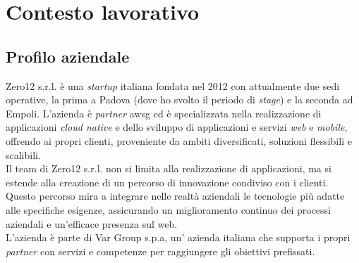 

\chapter{Contesto lavorativo}
\label{cap:introduzione}
\section{Profilo aziendale}
Zero12 s.r.l. è una \textit{startup} italiana fondata nel 2012 con attualmente due sedi operative, la prima a Padova (dove ho svolto il periodo di \textit{stage}) e la seconda ad Empoli. 
L'azienda è \textit{partner} \gls{awsg} ed è specializzata nella realizzazione di applicazioni \textit{cloud native} e dello sviluppo di applicazioni e servizi \textit{web} e \textit{mobile}, offrendo ai propri clienti, proveniente da ambiti diversificati, soluzioni flessibili e scalibili.\\
Il team di Zero12 s.r.l. non si limita alla realizzazione di applicazioni, ma si estende alla creazione di un percorso di innovazione condiviso con i clienti. Questo percorso mira a integrare nelle realtà aziendali le tecnologie più adatte alle specifiche esigenze, assicurando un miglioramento continuo dei processi aziendali e un’efficace presenza sul web.\\
L'azienda è parte di Var Group s.p.a, un' azienda italiana che supporta i propri \textit{partner} con servizi e competenze per raggiungere gli obiettivi prefissati.
